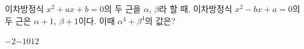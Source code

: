 이차방정식 $x^2+ax+b=0$의 두 근을 $\alpha$, $\beta$라 할 때, 이차방정식 $x^2-bx+a=0$의 두 근은 $\alpha+1$, $\beta+1$이다. 이때 $\alpha^4+\beta^4$의 값은? 
\begin{choices32}{$-2$}{$-1$}{$0$}{$1$}{$2$}\end{choices32}
